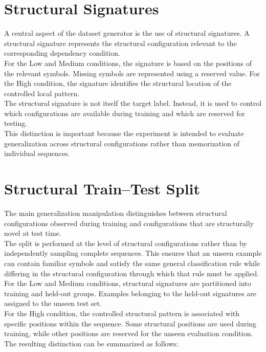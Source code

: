 \section{Structural Signatures}

\noindent
A central aspect of the dataset generator is the use of structural signatures. A structural signature represents the structural configuration relevant to the corresponding dependency condition.
\\
For the Low and Medium conditions, the signature is based on the positions of the relevant symbols. Missing symbols are represented using a reserved value. For the High condition, the signature identifies the structural location of the controlled local pattern.
\\
The structural signature is not itself the target label. Instead, it is used to control which configurations are available during training and which are reserved for testing.
\\
This distinction is important because the experiment is intended to evaluate generalization across structural configurations rather than memorization of individual sequences.

\section{Structural Train--Test Split}

\noindent
The main generalization manipulation distinguishes between structural configurations observed during training and configurations that are structurally novel at test time.
\\
The split is performed at the level of structural configurations rather than by independently sampling complete sequences. This ensures that an unseen example can contain familiar symbols and satisfy the same general classification rule while differing in the structural configuration through which that rule must be applied.
\\
For the Low and Medium conditions, structural signatures are partitioned into training and held-out groups. Examples belonging to the held-out signatures are assigned to the unseen test set.
\\
For the High condition, the controlled structural pattern is associated with specific positions within the sequence. Some structural positions are used during training, while other positions are reserved for the unseen evaluation condition.
\\
The resulting distinction can be summarized as follows:

